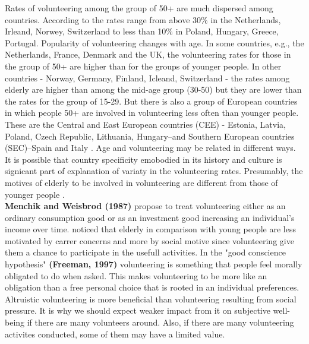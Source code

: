 \documentclass[10pt, letterpaper]{article}
\newcommand{\emd}[1]{\ExecuteMetaData[/tmp/tex]{#1}} %
\begin{document}
\begin{spacing}{1.4} %






Rates of volunteering among the group of 50+ are much dispersed among countries. According to \citet{Oecd16} the rates range from above 30\% in the Netherlands, Irleand, Norwey, Switzerland to less than 10\% in Poland, Hungary, Greece, Portugal. Popularity of volunteering changes with age. In some countries, e.g., the Netherlands, France, Denmark and the UK, the volunteering rates for those in the group of 50+ are higher than for the groups of younger people. In other countries - Norway, Germany, Finland, Icleand, Switzerland  - the rates among elderly are higher than among the mid-age group (30-50) but they are lower than the rates for the group of 15-29. But there is also a group of European countries in which people 50+ are involved in  volunteering less often than younger people. These are the Central and East European countries (CEE) - Estonia, Latvia, Poland, Czech Republic, Lithuania, Hungary--and  Southern European countries (SEC)--Spain and Italy \citep{Oecd16}.  Age and volunteering may be related in different ways. It is possible that country specificity emobodied in its history and culture is signicant part of explanation of variaty in the volunteering rates. Presumably, the motives of elderly to be involved in volunteering are different from those of younger people \citep{wilson12}. \\

\textbf{Menchik and Weisbrod (1987)} propose to treat  volunteering either as an ordinary consumption good or as an investment good increasing an individual's income over time. \citet{haski09} noticed that elderly in comparison with young people are less motivated by carrer concerns and  more by social motive since volunteering give them  a  chance to participate in the usefull activities. In the "good conscience hypothesis" \textbf{(Freeman, 1997)} volunteering is something that people feel morally obligated to do when asked. This makes volunteering to be more like an obligation than a free personal choice that is rooted in an individual preferences. Altruistic volunteering  is more beneficial than volunteering resulting from social pressure. It is why we should expect weaker impact from it on subjective well-being if there are many volunteers around. Also, if there are many volunteering activites conducted,  some of them may have a limited value.  \\


\end{spacing}
\end{document}
